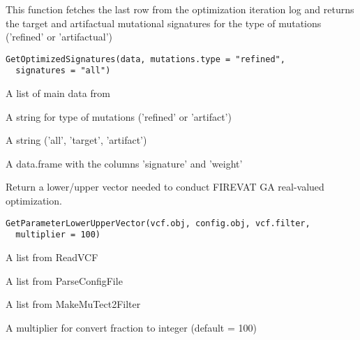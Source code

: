\documentclass[letterpaper]{book}
\begin{document}
%
\begin{Description}\relax
This function fetches the last row from the optimization iteration log
and returns the target and artifactual mutational signatures
for the type of mutations ('refined' or 'artifactual')
\end{Description}
%
\begin{Usage}
\begin{verbatim}
GetOptimizedSignatures(data, mutations.type = "refined",
  signatures = "all")
\end{verbatim}
\end{Usage}
%
\begin{Arguments}
\begin{ldescription}
\item[\code{data}] A list of main data from 

\item[\code{mutations.type}] A string for type of mutations ('refined' or 'artifact')

\item[\code{signatures}] A string ('all', 'target', 'artifact')
\end{ldescription}
\end{Arguments}
%
\begin{Value}
A data.frame with the columns 'signature' and 'weight'
\end{Value}
%
\begin{Description}\relax
Return a lower/upper vector needed to conduct FIREVAT GA real-valued optimization.
\end{Description}
%
\begin{Usage}
\begin{verbatim}
GetParameterLowerUpperVector(vcf.obj, config.obj, vcf.filter,
  multiplier = 100)
\end{verbatim}
\end{Usage}
%
\begin{Arguments}
\begin{ldescription}
\item[\code{vcf.obj}] A list from ReadVCF

\item[\code{config.obj}] A list from ParseConfigFile

\item[\code{vcf.filter}] A list from MakeMuTect2Filter

\item[\code{multiplier}] A multiplier for convert fraction to integer (default = 100)
\end{ldescription}
\end{Arguments}
\end{document}
